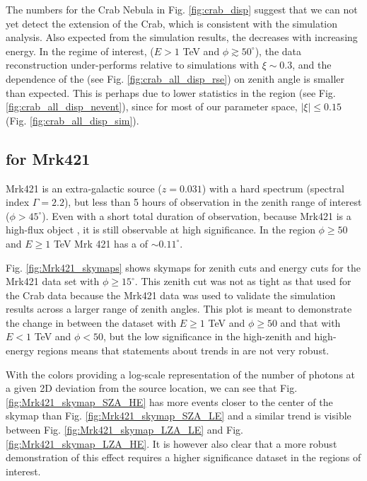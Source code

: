\documentclass[main.tex]{subfiles}
\begin{document}
The numbers for the Crab Nebula in Fig. \ref{fig:crab_disp} suggest that we can not yet detect the extension of the Crab, which is consistent with the simulation analysis. Also expected from the simulation results, the \rse decreases with increasing energy. In the regime of interest, ($E>1$ TeV and $\phi\gtrsim 50^\circ$), the data reconstruction under-performs relative to simulations with $\xi\sim 0.3$, and the dependence of the \rse (see Fig. \ref{fig:crab_all_disp_rse}) on zenith angle is smaller than expected. This is perhaps due to lower statistics in the region (see Fig. \ref{fig:crab_all_disp_nevent}), since for most of our parameter space, $|\xi| \leq 0.15$ (Fig. \ref{fig:crab_all_disp_sim}).

\subsection{\rse for Mrk421}
Mrk421 is an extra-galactic source ($z=0.031$) with a hard spectrum (spectral index $\Gamma=2.2$\cite{mrk421_index}), but less than 5 hours of observation in the zenith range of interest ($\phi>45^\circ$). Even with a short total duration of observation, because Mrk421 is a high-flux object \cite{mrk421_flux}, it is still observable at high significance. In the region $\phi\geq50$ and $E\geq 1$ TeV Mrk 421 has a \rse of $\sim 0.11^\circ$.

Fig. \ref{fig:Mrk421_skymaps} shows skymaps for zenith cuts and energy cuts for the Mrk421 data set with $\phi\geq15^\circ$. This zenith cut was not as tight as that used for the Crab data because the Mrk421 data was used to validate the simulation results across a larger range of zenith angles. This plot is meant to demonstrate the change in \rse between the dataset with $E\geq1$ TeV and $\phi\geq 50$ and that with $E<1$ TeV and $\phi<50$, but the low significance in the high-zenith and high-energy regions means that statements about trends in \rse are not very robust.

With the colors providing a log-scale representation of the number of photons at a given 2D deviation from the source location, we can see that Fig. \ref{fig:Mrk421_skymap_SZA_HE} has more events closer to the center of the skymap than Fig. \ref{fig:Mrk421_skymap_SZA_LE} and a similar trend is visible between Fig. \ref{fig:Mrk421_skymap_LZA_LE} and Fig. \ref{fig:Mrk421_skymap_LZA_HE}. It is however also clear that a more robust demonstration of this effect requires a higher significance dataset in the regions of interest.
\end{document}
